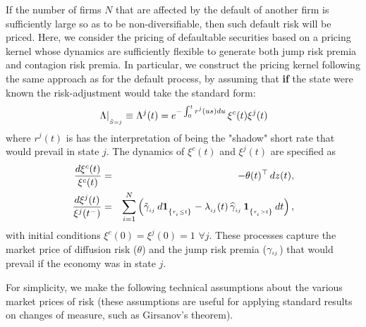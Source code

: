 \documentclass[titlepage,11pt]{article}
\def\by{\begin{eqnarray}}
\def\ey{\end{eqnarray}}
\begin{document}
If the number of firms $N$ that are affected by the default of
another firm is sufficiently large so as to be non-diversifiable,
then such default risk will be priced.
Here, we consider the pricing of defaultable securities based on a
pricing kernel whose dynamics are sufficiently flexible to generate
both jump risk premia and contagion risk premia. In particular, we
 construct the pricing kernel following the same approach as for
  the default process, by assuming that {\bf if} the state were
known  the risk-adjustment would take the standard form:
$$\left.\Lambda\right|_{_{{\tilde S=j}}}\equiv \Lambda^j(t)=e^{-\int_0^t r^j(us) du} \,
\xi^c(t)\xi^j(t)$$ where $r^j(t)$  is has the interpretation of
being the "shadow" short rate that would prevail in state $j$. The
dynamics of  $\xi^c(t)$ and $\xi^j(t)$ are specified as \by
\frac{d\xi^c(t)}{\xi^c(t)}&=& - \theta(t)^\top \, dz(t),
\label{dxic}\\
%
\frac{d\xi^j(t)}{\xi^j(t^-)} &=& \sum_{i=1}^N
\left(\tilde{\gamma}\sub{ij} \, d\ind{\tau\sub{i}\leq t}- \lij(t) \,
\hg\sub{ij} \, \ind{\tau\sub{i}>t} \, dt \right), \label{dxij} \ey
with initial conditions $\xi^c(0)=\xi^j(0)=1\,\,\forall j$. These
processes capture the market price of diffusion risk ($\theta$) and
the jump risk premia ($\gamma_{_{{ij}}}$) that would prevail if the
economy was in  state $j$.

For simplicity, we make the following technical assumptions about
the various market prices of risk (these assumptions are useful for
applying standard results on changes of measure, such as Girsanov's
theorem). \vspace*{3mm}

 \hspace*{-2mm}
\end{document}
